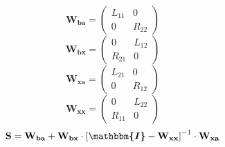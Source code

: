 \[ \mathbf{W_{ba}} = \left(\begin{array}{cc} L_{11} & 0 \\ 0 & R_{22}
\end{array}\right) \]
\[ \mathbf{W_{bx}} = \left(\begin{array}{cc} 0 & L_{12} \\ R_{21} & 0
\end{array}\right) \]
\[ \mathbf{W_{xa}} = \left(\begin{array}{cc} L_{21} & 0 \\ 0 & R_{12}
\end{array}\right) \]
\[ \mathbf{W_{xx}} = \left(\begin{array}{cc} 0 & L_{22} \\ R_{11} & 0
\end{array}\right) \]
\[ \mathbf{S}=\mathbf{W_{ba}}+\mathbf{W_{bx}}\cdot\left[
\boldsymbol{\mathbbm{I}}
-\mathbf{W_{xx}}\right]^{-1}\cdot\mathbf{W_{xa}} \]

